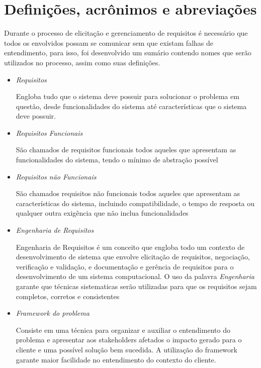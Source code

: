 \section{Definições, acrônimos e abreviações}

Durante o processo de elicitação e gerenciamento de requisitos é necessário que todos os envolvidos possam se comunicar sem que existam falhas de entendimento, para isso, foi desenvolvido um sumário contendo nomes que serão utilizados no processo, assim como suas definições.

\begin{itemize}

	\item \textit{Requisitos} 

		Engloba tudo que o sistema deve possuir para solucionar o problema em questão, desde funcionalidades do sistema até características que o sistema deve possuir.

	\item \textit{Requisitos Funcionais}

		São chamados de requisitos funcionais todos aqueles que apresentam as funcionalidades do sistema, tendo o mínimo de abstração possível %

	\item \textit{Requisitos não Funcionais}

		São chamados requisitos não funcionais todos aqueles que apresentam as características do sistema, incluindo compatibilidade, o tempo de resposta ou qualquer outra exigência que não inclua funcionalidades %

	\item \textit{Engenharia de Requisitos}

		Engenharia de Requisitos é um conceito que engloba todo um contexto de desenvolvimento de sistema que envolve elicitação de requisitos, negociação, verificação e validação, e documentação e gerência de requisitos para o desenvolvimento de um sistema computacional. O uso da palavra \textit{Engenharia} garante que técnicas sistematicas serão utilizadas para que os requisitos sejam completos, corretos e consistentes %

	\item \textit{Framework do problema}

		Consiste em uma técnica para organizar e auxiliar o entendimento do problema e apresentar aos stakeholders afetados o impacto gerado para o cliente e uma possível solução bem sucedida. A utilização do framework garante maior facilidade no entendimento do contexto do cliente.


\end{itemize}
